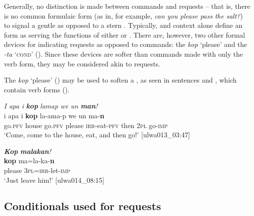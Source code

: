 
Generally, no distinction is made between commands and requests -- that is, there is no common  formulaic  form (as in, for example,  \textit{can you please pass the salt?}) to signal a gentle  as opposed to a stern . Typically,  and context alone define an  form as serving the  functions of either  or . There are, however, two other formal devices for indicating requests as opposed to commands: the  \textit{kop} ‘please’ and the   \textit{-ta} ‘\textsc{cond}’ (). Since these devices are softer than commands made with only the  verb form, they may be considered akin to requests.

  The  \textit{kop} ‘please’ () may be used to soften a , as seen in sentences  and , which contain  verb forms ().


\ea%
    \label{ex:syntax:92}
          \textit{I apa i} \textbf{\textit{kop}} \textit{lamap we un} \textbf{\textit{man}}\textit{!}\\
\gll    i    apa    i    \textbf{kop}  la{}-ama-p    we    un  ma-\textbf{n}\\
    go.\textsc{pfv}  house  go.\textsc{pfv}  please  \textsc{irr}{}-eat-\textsc{pfv}  then  \textsc{2pl}  go-\textsc{imp}\\
\glt `Come, come to the house, eat, and then go!’ [ulwa013\_03:47]
\z

\ea%
    \label{ex:syntax:93}
          \textbf{\textit{Kop}} \textbf{\textit{malakan}}\textit{!}\\
\gll    \textbf{kop}  ma=la-ka-\textbf{n}\\
    please  3\textsc{pl}=\textsc{irr-}let-\textsc{imp}\\
\glt `Just leave him!’ [ulwa014\_08:15]
\z

\subsection{Conditionals used for requests}\label{sec:13.2.3}

